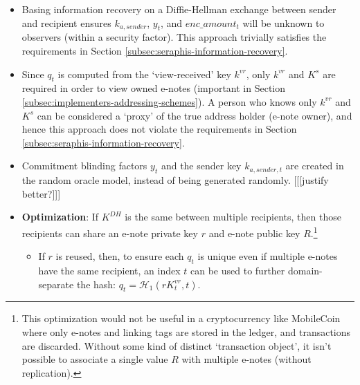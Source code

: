 \begin{itemize}
    \item Basing information recovery on a Diffie-Hellman exchange between sender and recipient ensures $k_{a,sender}$, $y_t$, and $enc\_amount_t$ will be unknown to observers (within a security factor). This approach trivially satisfies the requirements in Section \ref{subsec:seraphis-information-recovery}.

    \item Since $q_t$ is computed from the `view-received' key $k^{vr}$, only $k^{vr}$ and $K^s$ are required in order to view owned e-notes (important in Section \ref{subsec:implementers-addressing-schemes}). A person who knows only $k^{vr}$ and $K^s$ can be considered a `proxy' of the true address holder (e-note owner), and hence this approach does not violate the requirements in Section \ref{subsec:seraphis-information-recovery}.

    \item Commitment blinding factors $y_t$ and the sender key $k_{a,sender,t}$ are created in the random oracle model, instead of being generated randomly. [[[justify better?]]]


    \item \textbf{Optimization}: If $K^{DH}$ is the same between multiple recipients, then those recipients can share an e-note private key $r$ and e-note public key $R$.\footnote{This optimization would not be useful in a cryptocurrency like MobileCoin where only e-notes and linking tags are stored in the ledger, and transactions are discarded. Without some kind of distinct `transaction object', it isn't possible to associate a single value $R$ with multiple e-notes (without replication).}

    \begin{itemize}
        \item If $r$ is reused, then, to ensure each $q_t$ is unique even if multiple e-notes have the same recipient, an index $t$ can be used to further domain-separate the hash: $q_t = \mathcal{H}_1(r K^{vr}_t, t)$.


\end{itemize}
\end{itemize}
